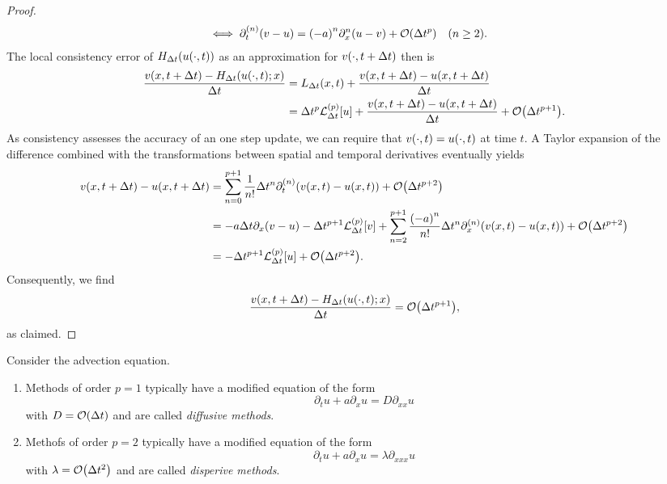 \begin{proof}
\begin{align*}
		\iff \partial_t^{\parentheses*{n}}\parentheses*{v - u} &= \parentheses*{-a}^n \partial_x^n \parentheses*{u - v} + \mathcal{O}\parentheses*{\Delta t^p} \quad \parentheses*{n \ge 2}.
	\end{align*}
	The local consistency error of \(H_{\Delta t}\parentheses*{u\parentheses*{\cdot, t}}\) as an approximation for \(v\parentheses*{\cdot, t + \Delta t}\) then is
	\begin{align*}
		\frac{v\parentheses*{x, t + \Delta t} - H_{\Delta t}\parentheses*{u\parentheses*{\cdot, t}; x}}{\Delta t} &= L_{\Delta t}\parentheses*{x, t} + \frac{v\parentheses*{x, t + \Delta t} - u\parentheses*{x, t + \Delta t}}{\Delta t}\\
		&= \Delta t^p \mathcal{L}_{\Delta t}^{\parentheses*{p}}\brackets*{u} + \frac{v\parentheses*{x, t + \Delta t}- u\parentheses*{x, t + \Delta t}}{\Delta t} + \mathcal{O}\parentheses*{\Delta t^{p + 1}}.
	\end{align*}
	As consistency assesses the accuracy of an one step update, we can require that \(v\parentheses*{\cdot, t} = u\parentheses*{\cdot, t}\) at time \(t\).
	A Taylor expansion of the difference combined with the transformations between spatial and temporal derivatives eventually yields
	\begin{align*}
		v\parentheses*{x, t + \Delta t} - u\parentheses*{x, t + \Delta t} &= \sum_{n = 0}^{p + 1}\frac{1}{n!}\Delta t^n \partial_t^{\parentheses*{n}}\parentheses*{v\parentheses*{x, t} - u\parentheses*{x, t}} + \mathcal{O}\parentheses*{\Delta t^{p + 2}}\\
		&= -a\Delta t\partial_x \parentheses*{v - u} - \Delta t^{p + 1}\mathcal{L}_{\Delta t}^{\parentheses*{p}}\brackets*{v} + \sum_{n = 2}^{p + 1}\frac{\parentheses*{-a}^n}{n!}\Delta t^n \partial_x^{\parentheses*{n}}\parentheses*{v\parentheses*{x, t} - u\parentheses*{x, t}} + \mathcal{O}\parentheses*{\Delta t^{p + 2}}\\
		&= -\Delta t^{p + 1}\mathcal{L}_{\Delta t}^{\parentheses*{p}}\brackets*{u} + \mathcal{O}\parentheses*{\Delta t^{p + 2}}.
	\end{align*}
	Consequently, we find
	\[
		\frac{v\parentheses*{x, t + \Delta t} - H_{\Delta t}\parentheses*{u\parentheses*{\cdot, t}; x}}{\Delta t} = \mathcal{O}\parentheses*{\Delta t^{p + 1}},
	\]
	as claimed.
\end{proof}

\begin{definition}
	Consider the advection equation.
	\begin{enumerate}
		\item Methods of order \(p = 1\) typically have a modified equation of the form
		\[
			\partial_t u + a\partial_x u = D\partial_{xx}u
		\]
		with \(D = \mathcal{O}\parentheses*{\Delta t}\) and are called \emph{diffusive methods}.
		\item Methofs of order \(p = 2\) typically have a modified equation of the form
		\[
			\partial_t u + a\partial_x u = \lambda\partial_{xxx}u
		\]
		with \(\lambda = \mathcal{O}\parentheses*{\Delta t^2}\) and are called \emph{disperive methods}.
	\end{enumerate}
\end{definition}

